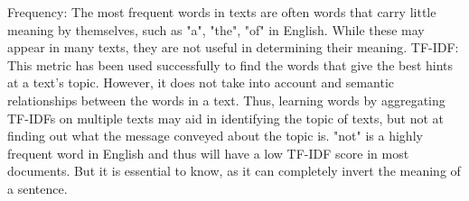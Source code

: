 Frequency: The most frequent words in texts are often words that carry little meaning by themselves, such as "a", "the", "of" in English.
While these may appear in many texts, they are not useful in determining their meaning.
TF-IDF: This metric has been used successfully to find the words that give the best hints at a text's topic.
However, it does not take into account and semantic relationships between the words in a text.
Thus, learning words by aggregating TF-IDFs on multiple texts may aid in identifying the topic of texts, but not at finding out what the message conveyed about the topic is.
"not" is a highly frequent word in English and thus will have a low TF-IDF score in most documents. But it is essential to know, as it can completely invert the meaning of a sentence.

